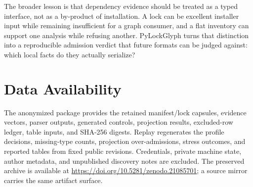 \documentclass[10pt,conference]{IEEEtran}
\begin{document}
The broader lesson is that dependency evidence should be treated as a typed interface, not as a by-product of installation. A lock can be excellent installer input while remaining insufficient for a graph consumer, and a flat inventory can support one analysis while refusing another. PyLockGlyph turns that distinction into a reproducible admission verdict that future formats can be judged against: which local facts do they actually serialize?

\section{Data Availability}
The anonymized package provides the retained manifest/lock capsules, evidence vectors, parser outputs, generated controls, projection results, excluded-row ledger, table inputs, and SHA-256 digests. Replay regenerates the profile decisions, missing-type counts, projection over-admissions, stress outcomes, and reported tables from fixed public revisions. Credentials, private machine state, author metadata, and unpublished discovery notes are excluded. The preserved archive is available at \url{https://doi.org/10.5281/zenodo.21085701}; a source mirror carries the same artifact surface.



\end{document}
